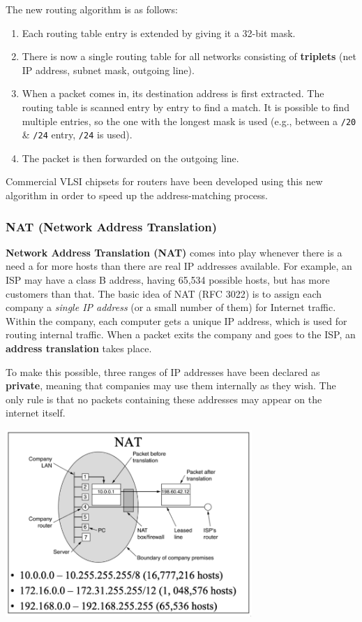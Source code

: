 \documentclass[11pt]{article}
\begin{document}
The new routing algorithm is as follows: 
\begin{enumerate} 
    \item   Each routing table entry is extended by giving it a 32-bit mask. 
    \item   There is now a single routing table for all networks consisting of \textbf{triplets} (net IP address, subnet mask, outgoing line). 
    \item   When a packet comes in, its destination address is first extracted. The routing table is scanned entry by entry to find a match. 
            It is possible to find multiple entries, so the one with the longest mask is used (e.g., between a \verb|/20| \& \verb|/24| entry, \verb|/24| is used).
    \item   The packet is then forwarded on the outgoing line.
\end{enumerate}

Commercial VLSI chipsets for routers have been developed using this new algorithm in order to speed up the address-matching process.

\subsubsection{NAT (Network Address Translation)} 
\textbf{Network Address Translation (NAT)} comes into play whenever there is a need a for more hosts than there are real IP addresses available. 
For example, an ISP may have a class B address, having 65,534 possible hosts, but has more customers than that.
The basic idea of NAT (RFC 3022) is to assign each company a \textit{single IP address} (or a small number of them) for Internet traffic. 
Within the company, each computer gets a unique IP address, which is used for routing internal traffic. 
When a packet exits the company and goes to the ISP, an \textbf{address translation} takes place.

To make this possible, three ranges of IP addresses have been declared as \textbf{private}, meaning that companies may use them internally as they wish. 
The only rule is that no packets containing these addresses may appear on the internet itself.

\begin{center}
    \includegraphics[width=0.7\textwidth]{nat.png}
\end{center}
\end{document}
